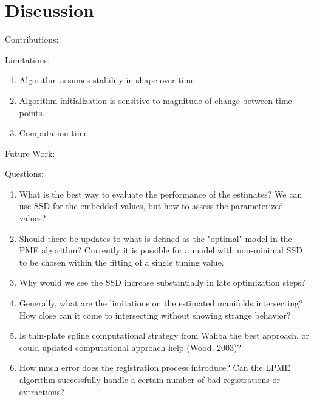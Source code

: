 \documentclass[11pt,reqno]{article}
\theoremstyle{definition}
\begin{document}
\section{Discussion}

Contributions:

Limitations:
\begin{enumerate}
  \item Algorithm assumes stability in shape over time.
  \item Algorithm initialization is sensitive to magnitude of change between time points.
  \item Computation time.
\end{enumerate}

Future Work:

Questions:
\begin{enumerate}
  \item What is the best way to evaluate the performance of the estimates? We can use SSD for the embedded values, but how to assess the parameterized values?
  \item Should there be updates to what is defined as the "optimal" model in the PME algorithm? Currently it is possible for a model with non-minimal SSD to be chosen within the fitting of a single tuning value.
  \item Why would we see the SSD increase substantially in late optimization steps?
  \item Generally, what are the limitations on the estimated manifolds intersecting? How close can it come to intersecting without showing strange behavior?
  \item Is thin-plate spline computational strategy from Wahba the best approach, or could updated computational approach help (Wood, 2003)?
  \item How much error does the registration process introduce? Can the LPME algorithm successfully handle a certain number of bad registrations or extractions?
\end{enumerate}

\nocite{*}
%
%
\printbibliography
\end{document}
